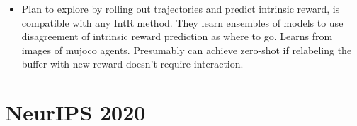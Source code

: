 \begin{itemize}
\item \citet{sekar2020planning} Plan to explore by rolling out trajectories and predict intrinsic reward, is compatible with any IntR method. They learn ensembles of models to use disagreement of intrinsic reward prediction as where to go. Learns from images of mujoco agents. Presumably can achieve zero-shot if relabeling the buffer with new reward doesn’t require interaction.
\end{itemize}





























\section{NeurIPS 2020}

